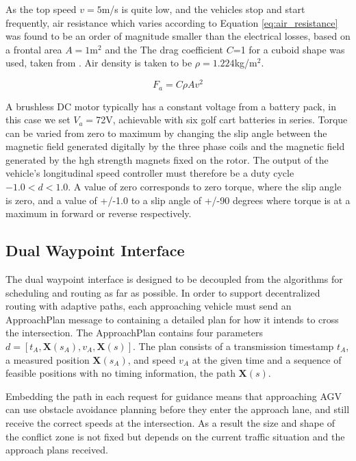 As the top speed $v=5$m/s is quite low, and the vehicles stop and start frequently, air resistance which varies according to Equation \ref{eq:air_resistance} was found to be an order of magnitude smaller than the electrical losses, based on a frontal area $A=1$m$^2$ and the The drag coefficient $C$=1 for a cuboid shape was used, taken from \cite{Toolbox2004}. Air density is taken to be $\rho=1.224$kg/m$^2$.

\begin{equation}
F_a = C\rho A v^2 
\label{eq:air_resistance}
\end{equation}

A brushless DC motor typically has a constant voltage from a battery pack, in this case we set $V_a=$72V, achievable with six golf cart batteries in series. Torque can be varied from zero to maximum by changing the slip angle between the magnetic field generated digitally by the three phase coils and the magnetic field generated by the hgh strength magnets fixed on  the rotor. The output of the vehicle's longitudinal speed controller must therefore be a duty cycle $-1.0<d<1.0$. A value of zero corresponds to zero torque, where the slip angle is zero, and a value of +/-1.0 to a slip angle of +/-90 degrees where torque is at a maximum in forward or reverse respectively.

\subsection{Dual Waypoint Interface}
\label{sec:dual_waypoint}
The dual waypoint interface is designed to be decoupled from the algorithms for scheduling and routing as far as possible. In order to support decentralized routing with adaptive paths, each approaching vehicle must send an ApproachPlan message to containing a detailed plan for how it intends to cross the intersection.  The ApproachPlan contains four parameters $d =\left[ t_A, \bm{X}( s_A ), v_A, \bm{X}(s) \right]$. The plan consists of a transmission timestamp $t_A$, a measured position $\bm{X}(s_A)$, and speed $v_A$ at the given time and a sequence of feasible positions with no timing information, the path $\bm{X}(s)$. 

Embedding the path in each request for guidance means that approaching AGV can use obstacle avoidance planning before they enter the approach lane, and still receive the correct speeds at the intersection. As a result the size and shape of the conflict zone is not fixed but depends on the current traffic situation and the approach plans received.


